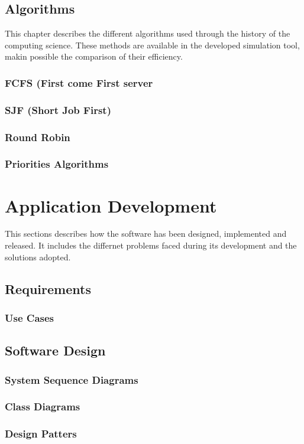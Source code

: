 \documentclass{report}
\begin{document}
    \section{Algorithms}
        This chapter describes the different algorithms used through the history of the computing science. These methods are available in the developed simulation tool, makin possible the comparison of their efficiency.
        \subsection{FCFS (First come First server}
        \subsection{SJF (Short Job First)}
        \subsection{Round Robin}
        \subsection{Priorities Algorithms}

\chapter{Application Development}
    This sections describes how the software has been designed, implemented and released. It includes the differnet problems faced during its development and the solutions adopted.
    \section{Requirements}
    \subsection{Use Cases}
    \section{Software Design}
    \subsection{System Sequence Diagrams}
    \subsection{Class Diagrams}
    \subsection{Design Patters}
\end{document}
